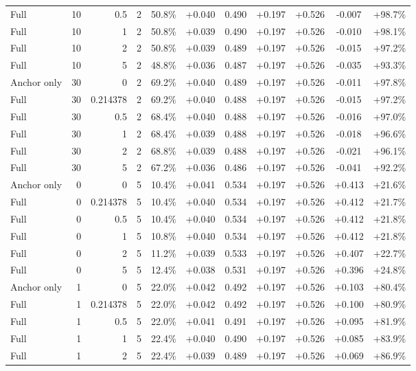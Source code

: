 \begin{table}[htbp]
\begin{tabular}{lrrrccccccc}
Full & 10 & 0.5 & 2 & 50.8\% & +0.040 & 0.490 & +0.197 & +0.526 & -0.007 & +98.7\% \\
Full & 10 & 1 & 2 & 50.8\% & +0.039 & 0.490 & +0.197 & +0.526 & -0.010 & +98.1\% \\
Full & 10 & 2 & 2 & 50.8\% & +0.039 & 0.489 & +0.197 & +0.526 & -0.015 & +97.2\% \\
Full & 10 & 5 & 2 & 48.8\% & +0.036 & 0.487 & +0.197 & +0.526 & -0.035 & +93.3\% \\
Anchor only & 30 & 0 & 2 & 69.2\% & +0.040 & 0.489 & +0.197 & +0.526 & -0.011 & +97.8\% \\
Full & 30 & 0.214378 & 2 & 69.2\% & +0.040 & 0.488 & +0.197 & +0.526 & -0.015 & +97.2\% \\
Full & 30 & 0.5 & 2 & 68.4\% & +0.040 & 0.488 & +0.197 & +0.526 & -0.016 & +97.0\% \\
Full & 30 & 1 & 2 & 68.4\% & +0.039 & 0.488 & +0.197 & +0.526 & -0.018 & +96.6\% \\
Full & 30 & 2 & 2 & 68.8\% & +0.039 & 0.488 & +0.197 & +0.526 & -0.021 & +96.1\% \\
Full & 30 & 5 & 2 & 67.2\% & +0.036 & 0.486 & +0.197 & +0.526 & -0.041 & +92.2\% \\
Anchor only & 0 & 0 & 5 & 10.4\% & +0.041 & 0.534 & +0.197 & +0.526 & +0.413 & +21.6\% \\
Full & 0 & 0.214378 & 5 & 10.4\% & +0.040 & 0.534 & +0.197 & +0.526 & +0.412 & +21.7\% \\
Full & 0 & 0.5 & 5 & 10.4\% & +0.040 & 0.534 & +0.197 & +0.526 & +0.412 & +21.8\% \\
Full & 0 & 1 & 5 & 10.8\% & +0.040 & 0.534 & +0.197 & +0.526 & +0.412 & +21.8\% \\
Full & 0 & 2 & 5 & 11.2\% & +0.039 & 0.533 & +0.197 & +0.526 & +0.407 & +22.7\% \\
Full & 0 & 5 & 5 & 12.4\% & +0.038 & 0.531 & +0.197 & +0.526 & +0.396 & +24.8\% \\
Anchor only & 1 & 0 & 5 & 22.0\% & +0.042 & 0.492 & +0.197 & +0.526 & +0.103 & +80.4\% \\
Full & 1 & 0.214378 & 5 & 22.0\% & +0.042 & 0.492 & +0.197 & +0.526 & +0.100 & +80.9\% \\
Full & 1 & 0.5 & 5 & 22.0\% & +0.041 & 0.491 & +0.197 & +0.526 & +0.095 & +81.9\% \\
Full & 1 & 1 & 5 & 22.4\% & +0.040 & 0.490 & +0.197 & +0.526 & +0.085 & +83.9\% \\
Full & 1 & 2 & 5 & 22.4\% & +0.039 & 0.489 & +0.197 & +0.526 & +0.069 & +86.9\% \\

\end{tabular}
\end{table}
